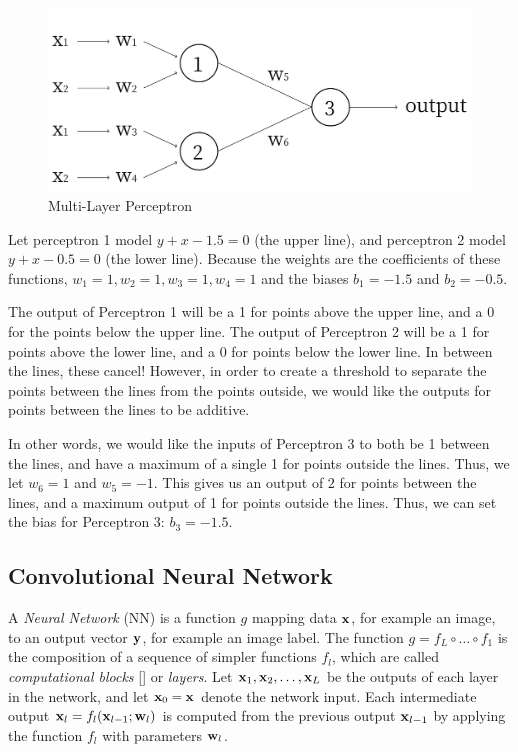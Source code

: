 \begin{figure}[H]
	\centering
	\includegraphics[scale=0.3]{images/Frame}
	\caption{Multi-Layer Perceptron}
	\label{f:Frame}
\end{figure}

Let perceptron 1 model $y + x - 1.5 = 0$ (the upper line), and perceptron 2 model $y + x - 0.5 = 0$ (the lower line). Because the weights are the coefficients of these functions, $w_1 = 1, w_2 = 1, w_3 = 1, w_4 = 1$ and the biases $b_1 = -1.5$ and $b_2 = -0.5$.

The output of Perceptron 1 will be a 1 for points above the upper line, and a 0 for the points below the upper line. The output of Perceptron 2 will be a 1 for points above the lower line, and a 0 for points below the lower line. In between the lines, these cancel! However, in order to create a threshold to separate the points between the lines from the points outside, we would like the outputs for points between the lines to be additive.

In other words, we would like the inputs of Perceptron 3 to both be 1 between the lines, and have a maximum of a single 1 for points outside the lines. Thus, we let $w_6 = 1$ and $w_5 = -1$. This gives us an output of $2$ for points between the lines, and a maximum output of 1 for points outside the lines. Thus, we can set the bias for Perceptron 3: $b_3 = -1.5$.


\subsection{Convolutional Neural Network}\label{s:cnn-structure}

A \emph{Neural Network} (NN) is a function $g$ mapping data $\mathbf{x}$, for example an image, to an output vector $\mathbf{y}$, for example an image label. The function $g=f_L \circ \dots \circ f_1$ is the composition of a sequence of simpler functions $f_l$, which are called \emph{computational blocks} [] or \emph{layers}. Let $\mathbf{x}_1,\mathbf{x}_2,\dots,\mathbf{x}_L$ be the outputs of each layer in the network, and let $\mathbf{x}_0=\mathbf{x}$ denote the network input. Each intermediate output $\mathbf{x}_l = f_l(\mathbf{x}_{l-1};\mathbf{w}_l)$ is computed from the previous output $\mathbf{x}_{l-1}$  by applying the function $f_l$ with parameters $\mathbf{w}_l$. 

